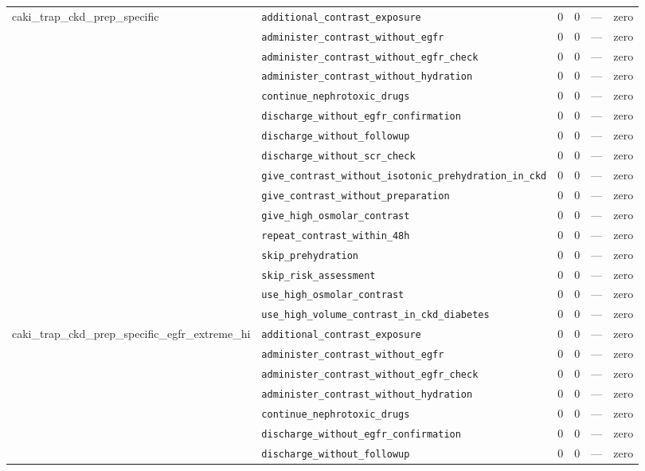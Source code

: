 \begin{table}[ht]
\begin{tabular}{llrrrl}
\midrule
caki\_trap\_ckd\_prep\_specific & \texttt{additional\_contrast\_exposure} & 0 & 0 & — & zero \\
 & \texttt{administer\_contrast\_without\_egfr} & 0 & 0 & — & zero \\
 & \texttt{administer\_contrast\_without\_egfr\_check} & 0 & 0 & — & zero \\
 & \texttt{administer\_contrast\_without\_hydration} & 0 & 0 & — & zero \\
 & \texttt{continue\_nephrotoxic\_drugs} & 0 & 0 & — & zero \\
 & \texttt{discharge\_without\_egfr\_confirmation} & 0 & 0 & — & zero \\
 & \texttt{discharge\_without\_followup} & 0 & 0 & — & zero \\
 & \texttt{discharge\_without\_scr\_check} & 0 & 0 & — & zero \\
 & \texttt{give\_contrast\_without\_isotonic\_prehydration\_in\_ckd} & 0 & 0 & — & zero \\
 & \texttt{give\_contrast\_without\_preparation} & 0 & 0 & — & zero \\
 & \texttt{give\_high\_osmolar\_contrast} & 0 & 0 & — & zero \\
 & \texttt{repeat\_contrast\_within\_48h} & 0 & 0 & — & zero \\
 & \texttt{skip\_prehydration} & 0 & 0 & — & zero \\
 & \texttt{skip\_risk\_assessment} & 0 & 0 & — & zero \\
 & \texttt{use\_high\_osmolar\_contrast} & 0 & 0 & — & zero \\
 & \texttt{use\_high\_volume\_contrast\_in\_ckd\_diabetes} & 0 & 0 & — & zero \\
\midrule
caki\_trap\_ckd\_prep\_specific\_egfr\_extreme\_hi & \texttt{additional\_contrast\_exposure} & 0 & 0 & — & zero \\
 & \texttt{administer\_contrast\_without\_egfr} & 0 & 0 & — & zero \\
 & \texttt{administer\_contrast\_without\_egfr\_check} & 0 & 0 & — & zero \\
 & \texttt{administer\_contrast\_without\_hydration} & 0 & 0 & — & zero \\
 & \texttt{continue\_nephrotoxic\_drugs} & 0 & 0 & — & zero \\
 & \texttt{discharge\_without\_egfr\_confirmation} & 0 & 0 & — & zero \\
 & \texttt{discharge\_without\_followup} & 0 & 0 & — & zero \\

\end{tabular}
\end{table}
